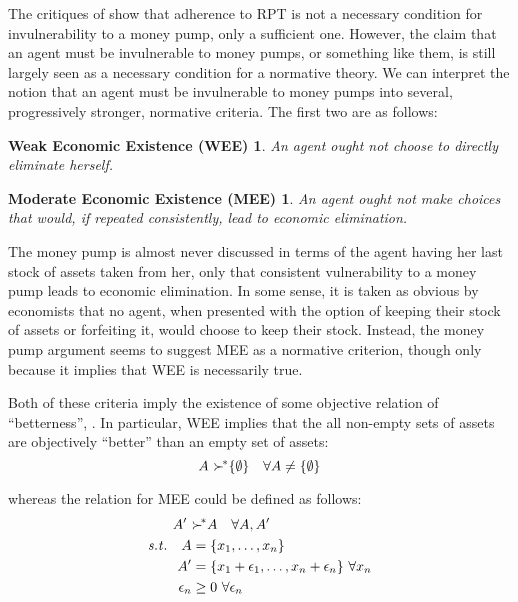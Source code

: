\documentclass[../main.tex]{subfiles}
\begin{document}
\addtocounter{footnote}{-1}

The critiques of \textcite{Cubitt2001} show that adherence to RPT is not a necessary condition for invulnerability to a money pump, only a sufficient one.
However, the claim that an agent must be invulnerable to money pumps, or something like them, is still largely seen as a necessary condition for a normative theory.
We can interpret the notion that an agent must be invulnerable to money pumps into several, progressively stronger, normative criteria.
The first two are as follows:

\newtheorem*{WEE}{Weak Economic Existence (WEE)}
\newtheorem*{MEE}{Moderate Economic Existence (MEE)}
\begin{WEE}
	\label{th:WEE}
	An agent ought not choose to directly eliminate herself.
\end{WEE}
\begin{MEE}
	\label{th:MEE}
	An agent ought not make choices that would, if repeated consistently, lead to economic elimination.
\end{MEE}

The money pump is almost never discussed in terms of the agent having her last stock of assets taken from her, only that consistent vulnerability to a money pump leads to economic elimination.
In some sense, it is taken as obvious by economists that no agent, when presented with the option of keeping their stock of assets or forfeiting it, would choose to keep their stock.
Instead, the money pump argument seems to suggest MEE as a normative criterion, though only because it implies that WEE is necessarily true.

Both of these criteria imply the existence of some objective relation of \enquote{betterness}, {\OB}.
In particular, WEE implies that the all non-empty sets of assets are objectively \enquote{better} than an empty set of assets:
\begin{equation}
	\label{eq2:WEE}
	A\ {\succ^{\!*}} \{\emptyset\} \quad \forall A \neq \{\emptyset\}
\end{equation}

\noindent whereas the {\OB} relation for MEE could be defined as follows:
\begin{align}
	\label{eq2:MEE}
	\begin{split}
		A^\prime\ &{\OB} A \quad\forall A, A^\prime\\
		\mathit{s.t.}\quad A &= \{x_1,\ldots,x_n\}\\
		A^\prime &= \{x_1 + \epsilon_1,\ldots,x_n+\epsilon_n\} \ \forall x_n \\
		\epsilon_n &\geq 0 \ \forall \epsilon_n
	\end{split}
\end{align}
\end{document}
